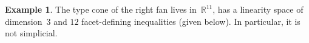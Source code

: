 \documentclass{amsart}
\theoremstyle{definition}
\newtheorem{example}[theorem]{Example}
\newcommand{\R}{\mathbb{R}} %
\begin{document}
\begin{example}


\medskip
\noindent
The type cone of the right fan lives in~$\R^{11}$, has a linearity space of dimension~$3$ and $12$ facet-defining inequalities (given below). In particular, it is not simplicial.


\end{example}
\end{document}
